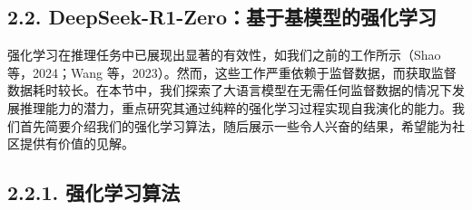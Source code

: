 \documentclass[12pt,a4paper]{report} %
\begin{document}
\subsection*{2.2. DeepSeek-R1-Zero：基于基模型的强化学习}


强化学习在推理任务中已展现出显著的有效性，如我们之前的工作所示（Shao 等，2024；Wang 等，2023）。然而，这些工作严重依赖于监督数据，而获取监督数据耗时较长。在本节中，我们探索了大语言模型在无需任何监督数据的情况下发展推理能力的潜力，重点研究其通过纯粹的强化学习过程实现自我演化的能力。我们首先简要介绍我们的强化学习算法，随后展示一些令人兴奋的结果，希望能为社区提供有价值的见解。


\subsection*{2.2.1. 强化学习算法}
\end{document}
